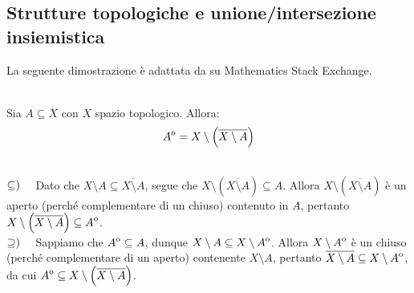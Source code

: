 \subsection{Strutture topologiche e unione/intersezione insiemistica}
La seguente dimostrazione è adattata da \cite{shalop:interior} su Mathematics Stack Exchange.
\begin{lemming}~{}\\
Sia $A\subseteq X$ con $X$ spazio topologico. Allora:
\begin{equation}
	{\kern0ptA}^{\mathrm{o}}=X\setminus\left(\overline{X\setminus A}\right)
\end{equation}
\vspace{-6mm}
\end{lemming}
\begin{demonstration}~{}\\
$\subseteq)\quad$ Dato che $X\setminus A\subseteq \overline{X\setminus A}$, segue che $X\setminus \left(\overline{X\setminus A}\right)\subseteq A$. Allora $X\setminus \left(\overline{X\setminus A}\right)$ è un aperto (perché complementare di un chiuso) contenuto in $A$, pertanto $X\setminus \left(\overline{X\setminus A}\right)\subseteq {\kern0ptA}^{\mathrm{o}}$.\\
$\supseteq)\quad$ Sappiamo che ${\kern0ptA}^{\mathrm{o}}\subseteq A$, dunque $X\setminus A\subseteq X\setminus {\kern0ptA}^{\mathrm{o}}$. Allora $X\setminus {\kern0ptA}^{\mathrm{o}}$ è un chiuso (perché complementare di un aperto) contenente $X\setminus A$, pertanto $\overline{X\setminus A}\subseteq X\setminus {\kern0ptA}^{\mathrm{o}}$, da cui ${\kern0ptA}^{\mathrm{o}}\subseteq X\setminus\left(\overline{X\setminus A}\right)$.
\end{demonstration}
